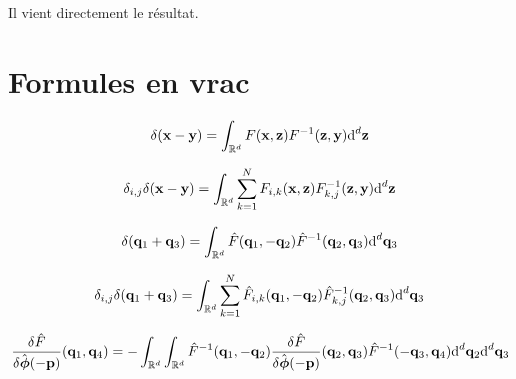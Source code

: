 \documentclass[10pt]{article}
\begin{document}
Il vient directement le résultat.



\section{Formules en vrac}

\begin{equation}
   \delta({\bf x} - {\bf y}) = \int_{\mathbb{R}^d} F({\bf x}, {\bf z}) F^{-1}({\bf z}, {\bf y}) \text{d}^d {\bf z}
\end{equation}

\begin{equation}
   \delta_{i,j} \delta({\bf x} - {\bf y}) = \int_{\mathbb{R}^d} \sum_{k=1}^{N} F_{i,k}({\bf x}, {\bf z}) F^{-1}_{k,j}({\bf z}, {\bf y}) \text{d}^d {\bf z}
\end{equation}

\begin{equation}
   \delta({\bf q}_1 +{\bf q}_3) = \int_{\mathbb{R}^d} \hat{F}({\bf q}_1, -{\bf q}_2) \hat{F}^{-1}({\bf q}_2, {\bf q}_3) \text{d}^d {\bf q}_3
\end{equation}


\begin{equation}
   \delta_{i,j}\delta({\bf q}_1 +{\bf q}_3) = \int_{\mathbb{R}^d} \sum_{k=1}^{N} \hat{F}_{i,k}({\bf q}_1, -{\bf q}_2) \hat{F}^{-1}_{k,j}({\bf q}_2, {\bf q}_3) \text{d}^d {\bf q}_3
\end{equation}

\begin{equation}
   \frac{\delta \hat{F}}{\delta \hat{\boldsymbol{ \phi}}(-{\bf p})}({\bf q}_1, {\bf q}_4) = - \int_{\mathbb{R}^d} \int_{\mathbb{R}^d} \hat{F}^{-1}({\bf q}_1, -{\bf q}_2) \frac{\delta \hat{F}}{\delta \hat{\boldsymbol{ \phi}}(-{\bf p})}({\bf q}_2, {\bf q}_3) \hat{F}^{-1}(-{\bf q}_3, {\bf q}_4) \text{d}^d {\bf q}_2 \text{d}^d {\bf q}_3
\end{equation}










\pagebreak
\end{document}
